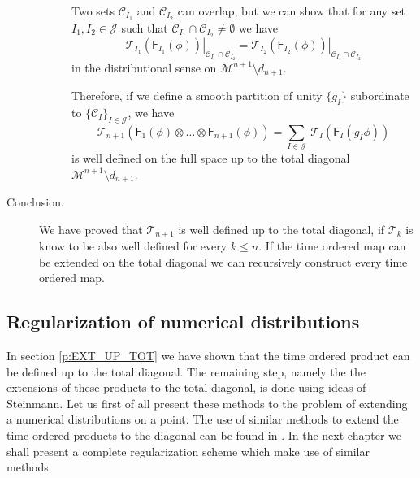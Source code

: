 \documentclass[11pt]{book}
\newcommand{\Ccal}{\mathcal{C}}
\newcommand{\Jcal}{\mathcal{J}}
\newcommand{\Mcal}{\mathcal{M}}
\newcommand{\Tcal}{\mathcal{T}}
\newcommand{\Fsf}{\mathsf{F}}
\theoremstyle{break}
\begin{document}
\begin{description}
\begin{description}
Two sets $\Ccal_{I_1}$ and $\Ccal_{I_2}$ can overlap, but we can show \cite[proposition 4.2]{BF_2000} that for any set $I_1 , I_2 \in \Jcal$ such that $\Ccal_{I_1} \cap \Ccal_{I_2} \neq \emptyset$ we have 
%
\begin{equation*}
\left. \Tcal_{I_1}\left(\Fsf_{I_1}(\phi)\right) \right|_{\Ccal_{I_1} \cap \Ccal_{I_2}} = \left. \Tcal_{I_2}\left(\Fsf_{I_2}(\phi)\right) \right|_{\Ccal_{I_1} \cap \Ccal_{I_2}}
\end{equation*}
%
in the distributional sense on $\Mcal^{n+1}\setminus d_{n+1}$.


Therefore, if we define a smooth partition of unity $\{ g_I\}$  subordinate to $\{\Ccal_I\}_{I\in\Jcal}$, we have
%
\begin{equation*}
\Tcal_{n+1}\left(\Fsf_1(\phi) \otimes \dots \otimes \Fsf_{n+1}(\phi) \right) = \sum_{I\in\Jcal} \  \Tcal_{I}\left(\Fsf_I(g_I\phi)\right)  
\end{equation*}
%
is well defined on the full space up to the total diagonal $\Mcal^{n+1} \setminus d_{n+1}$. 


\end{description}


\item[Conclusion.] We have proved that $\Tcal_{n+1}$ is well defined up to the total diagonal, if $\Tcal_k$ is know to be also well defined for every $k\leq n$. If the time ordered map can be extended on the total diagonal we can recursively construct every time ordered map.


\end{description}


\subsection{Regularization of numerical distributions}
\label{p:REG_NUMERRIC}


In section \ref{p:EXT_UP_TOT} we have shown that the time ordered product can be defined up to the total diagonal. The remaining step, namely the the extensions of these products to the total diagonal, is done using ideas of Steinmann. Let us first of all present these methods to the problem of extending a numerical distributions on a point. The use of similar methods to extend the time ordered products to the diagonal can be found in \cite{BF_2000}. In the next chapter we shall present a complete regularization scheme which make use of similar methods.
\end{document}
